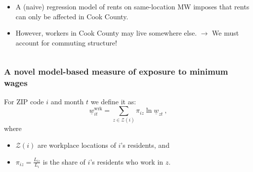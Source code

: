 \documentclass[aspectratio=169, t]{beamer}
\newcommand{\Z}{\mathcal{Z}}
\begin{document}
\begin{frame}
\begin{columns}
\begin{column}{0.56\textwidth}
\begin{itemize}
                \vspace{2mm}
                \pause
                \item A (naive) regression model of rents on same-location MW imposes 
				that rents can only be affected in Cook County.
                \vspace{2mm}
                \pause
                \item However, workers in Cook County may live somewhere else. 
				$\to$ We must account for commuting structure!
            \end{itemize}
        \end{column}
    \end{columns}
\end{frame}

\begin{frame}
\frametitle{A novel model-based measure of exposure to minimum wages}

    For ZIP code $i$ and month $t$ we define it as:
	$$
	\underline{w}^{\text{wrk}}_{it} = 
	\sum_{z \in \Z(i)} \pi_{i z} \ln \underline{w}_{zt} \ ,
	$$
	\vspace{-2.5mm}
	where
	\vspace{1mm}
	\begin{itemize} \small
		\item $\Z(i)$ are workplace locations of $i$'s residents, and
		\item $\pi_{i z} = \frac{L_{i z}}{L_i}$ is the share of $i$'s residents who work 
		in $z$.
	\end{itemize}
\end{frame}
\end{document}
